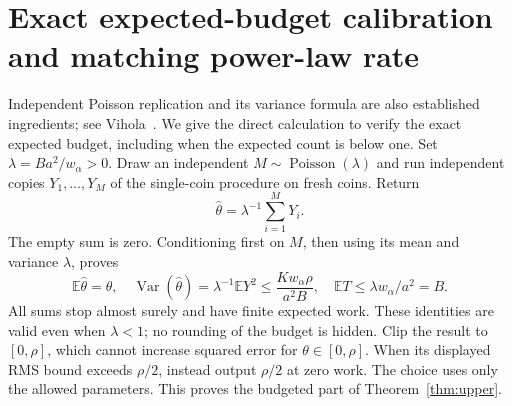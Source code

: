 \documentclass[11pt]{article}
\newcommand{\E}{\mathbb E}
\newcommand{\Var}{\operatorname{Var}}
\begin{document}
\section{Exact expected-budget calibration and matching power-law rate}
Independent Poisson replication and its variance formula are also established
ingredients; see Vihola~\cite[Example 8]{vihola}. We give the direct calculation
to verify the exact expected budget, including when the expected count is below one.
Set $\lambda=Ba^2/w_\alpha>0$. Draw an independent
$M\sim\operatorname{Poisson}(\lambda)$ and run independent copies $Y_1,\ldots,Y_M$
of the single-coin procedure on fresh coins. Return
\[
 \widehat\theta=\lambda^{-1}\sum_{i=1}^M Y_i.
\]
The empty sum is zero. Conditioning first on $M$, then using its mean and
variance $\lambda$, proves
\[
 \E\widehat\theta=\theta,
 \quad \Var(\widehat\theta)=\lambda^{-1}\E Y^2
            \le\frac{K w_\alpha\rho}{a^2B},
 \quad \E T\le\lambda w_\alpha/a^2=B.
\]
All sums stop almost surely and have finite expected work. These identities are
valid even when $\lambda<1$; no rounding of the budget is hidden. Clip the result
to $[0,\rho]$, which cannot increase squared error for $\theta\in[0,\rho]$.
When its displayed RMS bound exceeds $\rho/2$, instead output $\rho/2$ at zero
work. The choice uses only the allowed parameters. This proves the budgeted
part of Theorem~\ref{thm:upper}.
\end{document}
